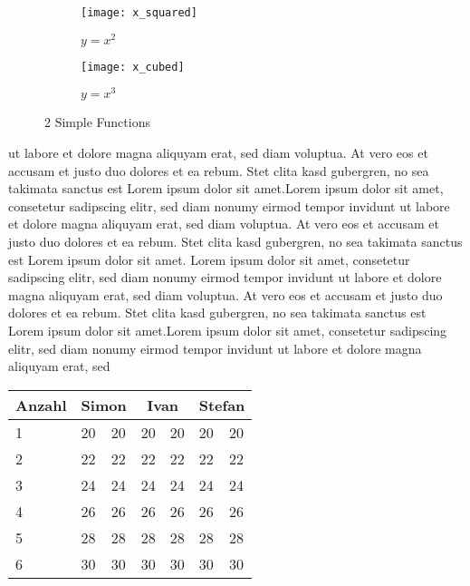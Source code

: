 \begin{figure}
	\centering
	\begin{subfigure}[b]{0.45\textwidth}
		\centering
		\texttt{[image: x\_squared]}
		\caption{$y = x^2$}
		\label{fig: x_squared}
	\end{subfigure}
	\hfill
	\begin{subfigure}[b]{0.45\textwidth}
		\centering
		\texttt{[image: x\_cubed]}
		\caption{$y = x^3$}
		\label{fig: x_cubed}
	\end{subfigure}
	\caption{2 Simple Functions}
	\label{fig: 2 func}
\end{figure}


ut labore et dolore magna aliquyam erat, sed diam voluptua. At vero eos et accusam et justo duo dolores et ea rebum. Stet clita kasd gubergren, no sea takimata sanctus est Lorem ipsum dolor sit amet.Lorem ipsum dolor sit amet, consetetur sadipscing elitr, sed diam nonumy eirmod tempor invidunt ut labore et dolore magna aliquyam erat, sed diam voluptua. At vero eos et accusam et justo duo dolores et ea rebum. Stet clita kasd gubergren, no sea takimata sanctus est Lorem ipsum dolor sit amet. Lorem ipsum dolor sit amet, consetetur sadipscing elitr, sed diam nonumy eirmod tempor invidunt ut labore et dolore magna aliquyam erat, sed diam voluptua. At vero eos et accusam et justo duo dolores et ea rebum. Stet clita kasd gubergren, no sea takimata sanctus est Lorem ipsum dolor sit amet.Lorem ipsum dolor sit amet, consetetur sadipscing elitr, sed diam nonumy eirmod tempor invidunt ut labore et dolore magna aliquyam erat, sed 

\begin{table}
\centering
\begin{tabular}{@{}lllllll@{}}
\toprule
Anzahl                  & \multicolumn{2}{c}{Simon}    & \multicolumn{2}{c}{Ivan}     & \multicolumn{2}{c}{Stefan}   \\ \midrule
\multicolumn{1}{|l|}{1} & 20 & \multicolumn{1}{l|}{20} & 20 & \multicolumn{1}{l|}{20} & 20 & \multicolumn{1}{l|}{20} \\
\multicolumn{1}{|l|}{2} & 22 & \multicolumn{1}{l|}{22} & 22 & \multicolumn{1}{l|}{22} & 22 & \multicolumn{1}{l|}{22} \\
\multicolumn{1}{|l|}{3} & 24 & \multicolumn{1}{l|}{24} & 24 & \multicolumn{1}{l|}{24} & 24 & \multicolumn{1}{l|}{24} \\
\multicolumn{1}{|l|}{4} & 26 & \multicolumn{1}{l|}{26} & 26 & \multicolumn{1}{l|}{26} & 26 & \multicolumn{1}{l|}{26} \\
\multicolumn{1}{|l|}{5} & 28 & \multicolumn{1}{l|}{28} & 28 & \multicolumn{1}{l|}{28} & 28 & \multicolumn{1}{l|}{28} \\
\multicolumn{1}{|l|}{6} & 30 & \multicolumn{1}{l|}{30} & 30 & \multicolumn{1}{l|}{30} & 30 & \multicolumn{1}{l|}{30} \\ \bottomrule
\end{tabular}
\end{table}


